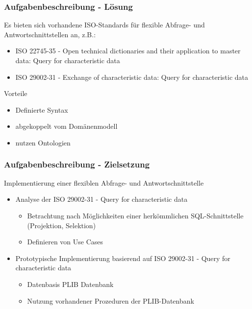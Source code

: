 \documentclass[serif,mathserif]{beamer}
\begin{document}
\begin{frame}
  \frametitle{Aufgabenbeschreibung - Lösung}
  Es bieten sich vorhandene ISO-Standards für flexible Abfrage- und Antwortschnittstellen an, z.B.:
  \begin{itemize}
  \item ISO 22745-35 - Open technical dictionaries and their application to master data: Query for characteristic data
  \item ISO 29002-31 - Exchange of characteristic data: Query for characteristic data
  \end{itemize}
  Vorteile
    \begin{itemize}
  \item Definierte Syntax
  \item abgekoppelt vom Domänenmodell
  \item nutzen Ontologien
    \end{itemize}
\end{frame}

\begin{frame}
  \frametitle{Aufgabenbeschreibung - Zielsetzung}
  Implementierung einer flexiblen Abfrage- und Antwortschnittstelle 
  \begin{itemize}
  \item Analyse der ISO 29002-31 - Query for characteristic data
     \begin{itemize}
     \item Betrachtung nach Möglichkeiten einer herkömmlichen SQL-Schnittstelle (Projektion, Selektion)
     \item Definieren von Use Cases
     \end{itemize}
  \item Prototypische Implementierung basierend auf ISO 29002-31 - Query for characteristic data
      \begin{itemize}
      \item Datenbasis PLIB Datenbank
      \item Nutzung vorhandener Prozeduren der PLIB-Datenbank
      \end{itemize}
  \end{itemize}
\end{frame}
\end{document}
